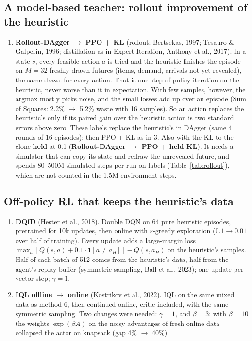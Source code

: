 \documentclass[11pt,a4paper]{article}
\begin{document}
\subsection{A model-based teacher: rollout improvement of the heuristic}
\begin{enumerate}[leftmargin=*,resume]
\item \textbf{Rollout-DAgger $\to$ PPO + KL} (rollout: Bertsekas, 1997; Tesauro \& Galperin, 1996; distillation as in
  Expert Iteration, Anthony et al., 2017). In a state $s$, every feasible action $a$ is tried and the heuristic
  finishes the episode on $M = 32$ freshly drawn futures (items, demand, arrivals not yet revealed), the same draws
  for every action. That is one step of policy iteration on the heuristic, never worse than it in expectation. With
  few samples, however, the argmax mostly picks noise, and the small losses add up over an episode (Sum of Squares:
  2.2\% $\to$ 5.2\% waste with 16 samples). So an action replaces the heuristic's only if its paired gain over the
  heuristic action is two standard errors above zero. These labels replace the heuristic's in DAgger (same 4 rounds
  of 16 episodes); then PPO + KL as in 3. Also with the KL to the clone \textbf{held} at 0.1
  (\textbf{Rollout-DAgger $\to$ PPO + held KL}). It needs a simulator that can copy its state and redraw the
  unrevealed future, and spends 80--500M simulated steps per run on labels (Table~\ref{tab:rollout}), which are not
  counted in the 1.5M environment steps.
\end{enumerate}

\subsection{Off-policy RL that keeps the heuristic's data}
\begin{enumerate}[leftmargin=*,resume]
\item \textbf{DQfD} (Hester et al., 2018). Double DQN on 64 pure heuristic episodes, pretrained for 10k updates, then
  online with $\varepsilon$-greedy exploration ($0.1 \to 0.01$ over half of training). Every update adds a
  large-margin loss $\max_a [Q(s,a) + 0.1\cdot\mathbf 1[a \neq a_H]] - Q(s, a_H)$ on the heuristic's samples. Half of
  each batch of 512 comes from the heuristic's data, half from the agent's replay buffer (symmetric sampling, Ball
  et al., 2023); one update per vector step; $\gamma = 1$.
\item \textbf{IQL offline $\to$ online} (Kostrikov et al., 2022). IQL on the same mixed data as method 6, then
  continued online, critic included, with the same symmetric sampling. Two changes were needed: $\gamma = 1$, and
  $\beta = 3$: with $\beta = 10$ the weights $\exp(\beta A)$ on the noisy advantages of fresh online data collapsed the
  actor on knapsack (gap 4\% $\to$ 40\%).
\end{enumerate}
\end{document}
